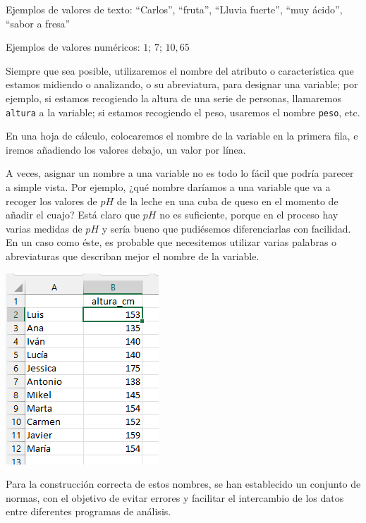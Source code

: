 \documentclass[
  letterpaper,
  DIV=11,
  numbers=noendperiod,
  oneside]{scrreprt}
\begin{document}
Ejemplos de valores de texto: ``Carlos'', ``fruta'', ``Lluvia fuerte'',
``muy ácido'', ``sabor a fresa''

Ejemplos de valores numéricos: \(1\); \(7\); \(10,65\)

Siempre que sea posible, utilizaremos el nombre del atributo o
característica que estamos midiendo o analizando, o su abreviatura, para
designar una variable; por ejemplo, si estamos recogiendo la altura de
una serie de personas, llamaremos \texttt{altura} a la variable; si
estamos recogiendo el peso, usaremos el nombre \texttt{peso}, etc.

En una hoja de cálculo, colocaremos el nombre de la variable en la
primera fila, e iremos añadiendo los valores debajo, un valor por línea.

A veces, asignar un nombre a una variable no es todo lo fácil que podría
parecer a simple vista. Por ejemplo, ¿qué nombre daríamos a una variable
que va a recoger los valores de \(pH\) de la leche en una cuba de queso
en el momento de añadir el cuajo? Está claro que \(pH\) no es
suficiente, porque en el proceso hay varias medidas de \(pH\) y sería
bueno que pudiésemos diferenciarlas con facilidad. En un caso como éste,
es probable que necesitemos utilizar varias palabras o abreviaturas que
describan mejor el nombre de la variable.

\begin{marginfigure}

{\centering \includegraphics{01-imagenes/aula1.png}

}

\end{marginfigure}

Para la construcción correcta de estos nombres, se han establecido un
conjunto de normas, con el objetivo de evitar errores y facilitar el
intercambio de los datos entre diferentes programas de análisis.
\end{document}

